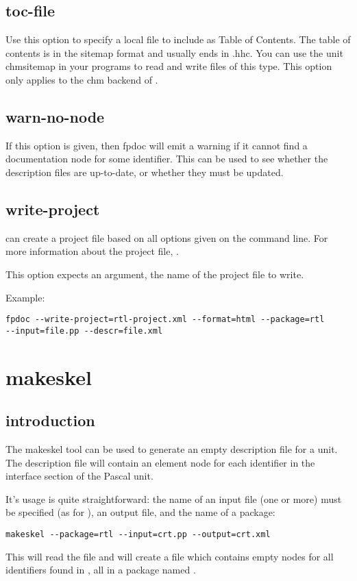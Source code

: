 \subsection{toc-file}
Use this option to specify a local file to include as Table of Contents.
The table of contents is in the sitemap format and usually ends in .hhc. You
can use the unit chmsitemap in your programs to read and write files of this type.
This option only applies to the chm backend of \fpdoc.

\subsection{warn-no-node}
\label{suse:warnnonode}
If this option is given, then fpdoc will emit a warning if it cannot find a
documentation node for some identifier. This can be used to see whether the
description files are up-to-date, or whether they must be updated.

\subsection{write-project}
\label{suse:write-project}
\fpdoc can create a project file based on all options given on the command
line. For more information about the project file, .

This option expects an argument, the name of the project file to write.

Example:
\begin{verbatim}
fpdoc --write-project=rtl-project.xml --format=html --package=rtl
--input=file.pp --descr=file.xml
\end{verbatim}


\section{makeskel}
\label{se:makeskel}

\subsection{introduction}
\label{suse:makeskelintro}
The makeskel tool can be used to generate an empty description file 
for a unit. The description file will contain an element node for each
identifier in the interface section of the Pascal unit. 

It's usage is quite straightforward: the name of an input file 
(one or more) must be specified (as for \fpdoc), an output file,
and the name of a package:
\begin{verbatim}
makeskel --package=rtl --input=crt.pp --output=crt.xml
\end{verbatim}
This will read the file  and will create a file 
which contains empty nodes for all identifiers found in , all
in a package named .

